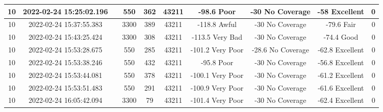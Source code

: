 \begin{longtable*}{|c|c|c|c|c|c|c|c|c|c|}
10&2022-02-24 15:25:02.196&&550&362&43211& -98.6     Poor        & -30       No Coverage & -58       Excellent   & 0\\\hline
{}10&2022-02-24 15:37:55.383&&3300&389&43211& -118.8    Awful       & -30       No Coverage & -79.6     Fair        & 0\\\hline
{}10&2022-02-24 15:43:25.424&&3300&308&43211& -113.5    Very Bad    & -30       No Coverage & -74.4     Good        & 0\\\hline
{}10&2022-02-24 15:53:28.675&&550&285&43211& -101.2    Very Poor   & -28.6     No Coverage & -62.8     Excellent   & 0\\\hline
{}10&2022-02-24 15:53:38.246&&550&432&43211& -95.8     Poor        & -30       No Coverage & -56.8     Excellent   & 0\\\hline
{}10&2022-02-24 15:53:44.081&&550&378&43211& -100.1    Very Poor   & -30       No Coverage & -61.2     Excellent   & 0\\\hline
{}10&2022-02-24 15:53:51.483&&550&291&43211& -100.9    Very Poor   & -30       No Coverage & -61.6     Excellent   & 0\\\hline
{}10&2022-02-24 16:05:42.094&&3300&79&43211& -101.4    Very Poor   & -30       No Coverage & -62.4     Excellent   & 0\\\hline

\end{longtable*}
